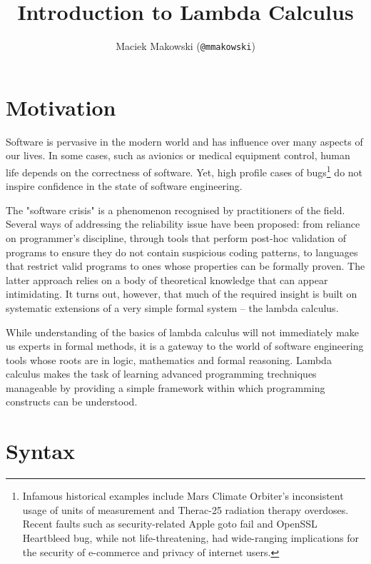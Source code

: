 \documentclass[11pt,twoside,a4paper]{article} %
\begin{document}
\title{Introduction to Lambda Calculus}
\author{Maciek Makowski (\texttt{@mmakowski})}
\maketitle

\section{Motivation}

Software is pervasive in the modern world and has influence over many aspects 
of our lives. In some cases, such as avionics or medical equipment control, 
human life depends on the correctness of software. Yet, high profile cases of 
bugs\footnote{Infamous historical examples include Mars Climate 
Orbiter's inconsistent usage of units of measurement\cite{mco} and Therac-25 
radiation therapy overdoses\cite{therac25}. Recent faults such as
security-related Apple goto fail\cite{cve141266} and OpenSSL Heartbleed
bug\cite{cve140160},
while not life-threatening, had wide-ranging implications for the security of
e-commerce and privacy of internet users.} do not inspire confidence in the 
state of software engineering. 

The "software crisis" is a phenomenon recognised 
by practitioners of the field. Several ways of addressing the reliability issue 
have been proposed: from reliance on programmer's 
discipline\cite{cleancode}\cite{securecoding}, through tools that
perform post-hoc validation of programs to ensure they do not contain suspicious
coding patterns\cite{raf04}, to languages 
that restrict valid programs to ones whose properties can be formally proven. 
The latter approach relies on a body of 
theoretical knowledge that can appear intimidating. It turns out, 
however, that much of the required insight is built on systematic extensions of 
a very simple formal system -- the lambda calculus. 

While understanding of the basics of lambda calculus will not immediately 
make us experts in formal methods, it is a gateway to the world of software
engineering tools whose roots are in logic, mathematics and formal reasoning.
Lambda calculus makes the task of learning advanced programming trechniques
manageable by providing a simple framework within which programming constructs
can be understood.

\section{Syntax}
\end{document}
